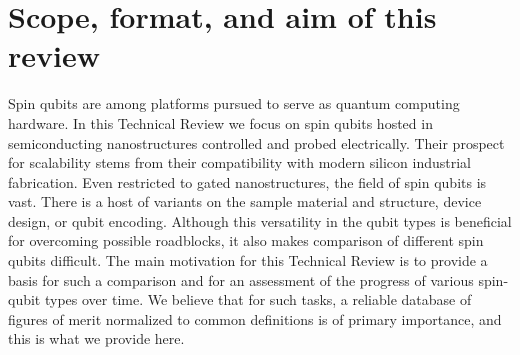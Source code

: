 \documentclass[aps, prx, showpacs, twocolumn, superscriptaddress, notitlepage, longbibliography, floatfix, nofootinbib]{revtex4-2}
\begin{document}
\hypersetup{pageanchor=false}
\maketitle
\hypersetup{pageanchor=true}




\section{Scope, format, and aim of this review}
Spin qubits are among platforms pursued to serve as quantum computing hardware. In this Technical Review we focus on spin qubits hosted in semiconducting nanostructures controlled and probed electrically. Their prospect for scalability stems from their compatibility with modern silicon industrial fabrication. Even restricted to gated nanostructures, the field of spin qubits is vast. There is a host of variants on the sample material and structure, device design, or qubit encoding. Although this versatility in the qubit types is beneficial for overcoming possible roadblocks, it also makes comparison of different spin qubits difficult. The main motivation for this Technical Review is to provide a basis for such a comparison and for an assessment of the progress of various spin-qubit types over time. We believe that for such tasks, a reliable database of figures of merit normalized to common definitions is of primary importance, and this is what we provide here.
\end{document}
